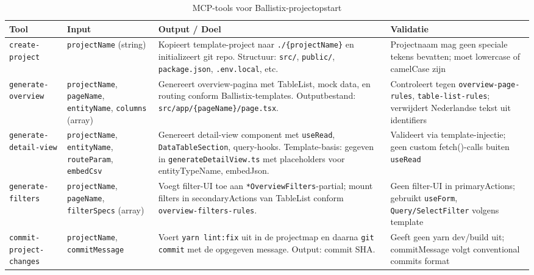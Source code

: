 \begin{table}[htbp]
  \centering
  \caption{MCP-tools voor Ballistix-projectopstart}
  \label{tab:mcp-tools}
  \small
  \begin{tabularx}{\textwidth}{|l|l|X|l|}
    \hline
    \textbf{Tool} & \textbf{Input} & \textbf{Output / Doel} & \textbf{Validatie} \\
    \hline
    \texttt{create-project} & 
    \texttt{projectName} (string) &
    Kopieert template-project naar \texttt{./\{projectName\}} en initializeert git repo. Structuur: \texttt{src/}, \texttt{public/}, \texttt{package.json}, \texttt{.env.local}, etc. &
    Projectnaam mag geen speciale tekens bevatten; moet lowercase of camelCase zijn \\
    \hline
    \texttt{generate-overview} &
    \texttt{projectName}, \texttt{pageName}, \texttt{entityName}, \texttt{columns} (array) &
    Genereert overview-pagina met TableList, mock data, en routing conform Ballistix-templates. Outputbestand: \texttt{src/app/\{pageName\}/page.tsx}. &
    Controleert tegen \texttt{overview-page-rules}, \texttt{table-list-rules}; verwijdert Nederlandse tekst uit identifiers \\
    \hline
    \texttt{generate-detail-view} &
    \texttt{projectName}, \texttt{entityName}, \texttt{routeParam}, \texttt{embedCsv} &
    Genereert detail-view component met \texttt{useRead}, \texttt{DataTableSection}, query-hooks. Template-basis: gegeven in \texttt{generateDetailView.ts} met placeholders voor entityTypeName, embedJson. &
    Valideert via template-injectie; geen custom fetch()-calls buiten \texttt{useRead} \\
    \hline
    \texttt{generate-filters} &
    \texttt{projectName}, \texttt{pageName}, \texttt{filterSpecs} (array) &
    Voegt filter-UI toe aan \texttt{*OverviewFilters}-partial; mount filters in secondaryActions van TableList conform \texttt{overview-filters-rules}. &
    Geen filter-UI in primaryActions; gebruikt \texttt{useForm}, \texttt{Query/SelectFilter} volgens template \\
    \hline
    \texttt{commit-project-changes} &
    \texttt{projectName}, \texttt{commitMessage} &
    Voert \texttt{yarn lint:fix} uit in de projectmap en daarna \texttt{git commit} met de opgegeven message. Output: commit SHA. &
    Geeft geen yarn dev/build uit; commitMessage volgt conventional commits format \\
    \hline
  \end{tabularx}
\end{table}

